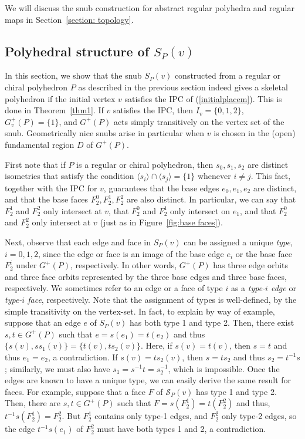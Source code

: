 \documentclass[12pt]{article}
\theoremstyle{definition}\newtheorem{definition}{Definition}[section]
\begin{document}
We will discuss the snub construction for abstract regular polyhedra and regular maps in Section~\ref{section: topology}.

\subsection{Polyhedral structure of ${S}_P(v)$}
\label{polyhedralstruc}

In this section, we show that the snub ${S}_P(v)$ constructed from a regular or chiral polyhedron $P$ as described in the previous section indeed gives a skeletal polyhedron if the initial vertex $v$ satisfies the IPC of (\ref{initialplacem}). This is done in Theorem~\ref{thm1}. If $v$ satisfies the IPC, then $I_v=\{0,1,2\}$, $G_v^+(P)=\{1\}$, and $G^{+}(P)$ acts simply transitively on the vertex set of the snub. Geometrically nice snubs arise in particular when $v$ is chosen in the (open) fundamental region $D$ of $G^+(P)$.
\smallskip    

First note that if $P$ is a regular or chiral polyhedron, then $s_0, s_1, s_2$ are distinct isometries that satisfy the condition $\langle s_i \rangle \cap \langle s_j \rangle = \{1\}$ whenever $i\neq j$. This fact, together with the IPC for $v$, guarantees that the base edges $e_0, e_1, e_2$ are distinct, and that the base faces $F_2^0, F_2^1, F_2^2$ are also distinct. In particular, we can say that $F_2^1$ and $F_2^2$ only intersect at $v$, that $F_2^0$ and $F_2^1$ only intersect on $e_1$, and that $F_2^0$ and $F_2^2$ only intersect at $v$ (just as in Figure~\ref{fig:base faces}).  

Next, observe that each edge and face in ${S}_P(v)$ can be assigned a unique {\it type\/}, $i=0,1,2$, since the edge or face is an image of the base edge $e_i$ or the base face $F_2^i$ under $G^{+}(P)$, respectively. In other words, $G^{+}(P)$ has three edge orbits and three face orbits represented by the three base edges and three base faces, respectively. We sometimes refer to an edge or a face of type $i$ as a {\it type-$i$ edge} or {\it type-$i$ face}, respectively. Note that the assignment of types is well-defined, by the simple transitivity on the vertex-set. In fact, to explain by way of example, suppose that an edge $e$ of ${S}_P(v)$ has both type 1 and type 2. Then, there exist $s, t\in G^+(P)$ such that $e = s(e_1) = t(e_2)$  and thus $\{s(v), ss_1(v)\} = \{t(v), ts_2(v)\}$. Here, if $s(v) = t(v)$, then $s = t$ and thus $e_1 = e_2$, a contradiction. If $s(v) = ts_2(v)$, then $s = ts_2$ and thus $s_2 = t^{-1}s$;  similarly, we must also have $s_1 = s^{-1}t = s_2^{-1}$, which is impossible. Once the edges are known to have a unique type, we can easily derive the same result for faces. For example, suppose that a face $F$ of $\mathcal{S}_P(v)$ has type 1 and type 2. Then, there are $s, t\in G^+(P)$ such that $F = s(F_2^1) = t(F_2^2)$ and thus, $t^{-1}s(F_2^1) = F_2^2$. But $F_2^1$ contains only type-1 edges, and $F_2^2$ only type-2 edges, so the edge $t^{-1}s(e_1)$ of $F_2^2$ must have both types 1 and 2, a contradiction. \smallskip
\end{document}

